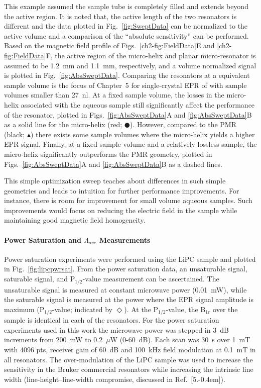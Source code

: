 This example assumed the sample tube is completely filled and extends beyond the active region. It is noted that, the active length of the two resonators is different and the data plotted in Fig.~\ref{fig:SweptData} can be normalized to the active volume and a comparison of the ``absolute sensitivity'' can be performed. Based on the magnetic field profile of  Figs.~\ref{ch2-fig:FieldData}E and \ref{ch2-fig:FieldData}F, the active region of the micro-helix and planar micro-resonator is assumed to be 1.2~mm and 1.1~mm, respectively, and a volume normalized signal is plotted in Fig.~\ref{fig:AbsSweptData}. Comparing the resonators at a equivalent sample volume is the focus of Chapter~5 for single-crystal EPR of with sample volumes smaller than 27~nl. At a fixed sample volume, the losses in the micro-helix associated with the aqueous sample still significantly affect the performance of the resonator, plotted in Figs.~\ref{fig:AbsSweptData}A and \ref{fig:AbsSweptData}B as a solid line for the micro-helix (red; $\CIRCLE$). However, compared to the PMR (black; $\blacktriangle$) there exists some sample volumes where the micro-helix yields a higher EPR signal. Finally, at a fixed sample volume and a relatively lossless sample, the micro-helix significantly outperforms the PMR geometry, plotted in Figs.~\ref{fig:AbsSweptData}A and \ref{fig:AbsSweptData}B as a dashed lines.

This simple optimization sweep teaches about differences in such simple geometries and leads to intuition for further performance improvements. For instance, there is room for improvement for small volume aqueous samples. Such improvements would focus on reducing the electric field in the sample while maintaining good magnetic field homogeneity. 


\paragraph{Power Saturation and $\Lambda_{ave}$ Measurements}
Power saturation experiments were performed using the LiPC sample and plotted in Fig.~\ref{fig:lipcpwrsat}. From the power saturation data, an unsaturable signal, saturable signal, and P$_{1/2}$-value measurement can be ascertained. The unsaturable signal is measured at constant microwave power (0.01~mW), while the saturable signal is measured at the power where the EPR signal amplitude is maximum (P$_{1/2}$-value; indicated by $\Diamond$). At the P$_{1/2}$-value, the B$_{1r}$ over the sample is identical in each of the resonators. For the power saturation experiments used in this work the microwave power was stepped in 3~dB increments from 200~mW to 0.2~$\mu$W (0-60~dB). Each scan was 30~s over 1~mT with 4096 pts, receiver gain of 60~dB and 100~kHz field modulation at 0.1~mT in all resonators. The over-modulation of the LiPC sample was used to increase the sensitivity in the Bruker commercial resonators while increasing the intrinsic line width (line-height--line-width compromise, discussed in Ref.~[5.\kern-0.4em]). 

